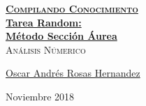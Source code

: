 \documentclass[12pt, fleqn]{article}                            %
\author{Oscar Andrés Rosas}                                     %
\theoremstyle{break}                                            %
\begin{document}
\begin{titlepage}
    
    \pagecolor{TitlePageColor}                                      %
    \color{white}                                                   %

    \vspace                                                         %
    \baselineskip                                                   %

    \makebox[0pt][l]{\rule{1.3\textwidth}{3pt}}                     %
    
    \href{https://compilandoconocimiento.com}                       %
    {\textbf{\textsc{\Huge Compilando Conocimiento}}}\\[2.7cm]      %

    \href{\ProjectNameLink}                                         %
    {\fontsize{35}{48}\selectfont \textbf{Tarea Random: \\Método Sección Áurea}}\\[0.5cm]   %
    \textcolor{ColorSubtext}{\textsc{\Huge Análisis Númerico}}      %
    
    \vfill                                                          %
    
    \href{\ProjectAuthorLink}                                       %
    {\LARGE \textsf{Oscar Andrés Rosas Hernandez}}                  %

    \vspace                                                         %
    \baselineskip                                                   %
    
    {\large \textsf{Noviembre 2018}}                                %
\end{titlepage}
\end{document}
